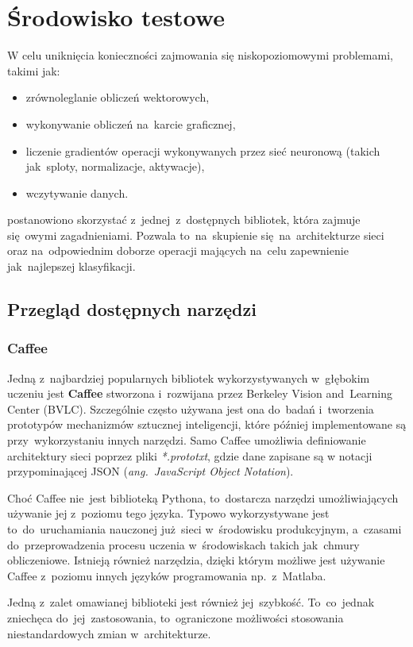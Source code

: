 \chapter{Środowisko testowe}
W celu uniknięcia konieczności zajmowania się niskopoziomowymi problemami, takimi jak:
\begin{itemize}
    \item zrównoleglanie obliczeń wektorowych,
    \item wykonywanie obliczeń na~karcie graficznej,
    \item liczenie gradientów operacji wykonywanych przez sieć neuronową (takich jak~sploty, normalizacje, aktywacje),
    \item wczytywanie danych.
\end{itemize}
postanowiono skorzystać z~jednej~z~dostępnych bibliotek, która zajmuje się~owymi zagadnieniami. Pozwala to~na~skupienie
się~na~architekturze sieci oraz na~odpowiednim doborze operacji mających na~celu zapewnienie jak~najlepszej
klasyfikacji.

\section{Przegląd dostępnych narzędzi}
\subsection{Caffee}
Jedną z~najbardziej popularnych bibliotek wykorzystywanych w~głębokim uczeniu jest \textbf{Caffee} stworzona
i~rozwijana przez Berkeley Vision and~Learning Center (BVLC). Szczególnie często używana jest ona do~badań i~tworzenia
prototypów mechanizmów sztucznej inteligencji, które później implementowane są przy~wykorzystaniu innych narzędzi.
Samo Caffee umożliwia definiowanie architektury sieci poprzez pliki \textit{*.prototxt}, gdzie dane zapisane są
w notacji przypominającej JSON (\textit{ang.~JavaScript Object Notation}).

Choć Caffee nie~jest biblioteką Pythona, to~dostarcza narzędzi umożliwiających używanie jej z~poziomu tego języka.
Typowo wykorzystywane jest to~do~uruchamiania nauczonej już~sieci w~środowisku produkcyjnym, a~czasami
do~przeprowadzenia procesu uczenia w~środowiskach takich jak~chmury obliczeniowe. Istnieją również narzędzia,
dzięki którym możliwe jest używanie Caffee z~poziomu innych języków programowania np.~z~Matlaba.

Jedną z~zalet omawianej biblioteki jest również jej~szybkość. To~co~jednak zniechęca do~jej~zastosowania, to~ograniczone
możliwości stosowania niestandardowych zmian w~architekturze.

